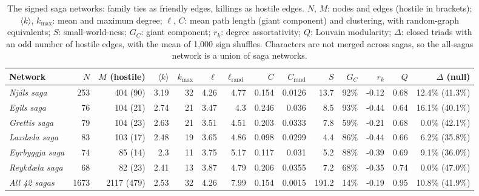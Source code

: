 \begin{table}[t!]
\centering
\caption{The signed saga networks: family ties as friendly edges, killings as hostile edges. $N$, $M$: nodes and edges (hostile in brackets); $\langle k\rangle$, $k_{\max}$: mean and maximum degree; $\ell$, $C$: mean path length (giant component) and clustering, with random-graph equivalents; $S$: small-world-ness; $G_C$: giant component; $r_k$: degree assortativity; $Q$: Louvain modularity; $\Delta$: closed triads with an odd number of hostile edges, with the mean of 1{,}000 sign shuffles. Characters are not merged across sagas, so the all-sagas network is a union of saga networks.}
\label{tab:network}
\begin{tabular*}{\textwidth}{@{\extracolsep{\fill}}lrrrrrrrrrrrrr@{}}
\toprule
Network & $N$ & $M$ (hostile) & $\langle k\rangle$ & $k_{\max}$ & $\ell$ & $\ell_{\mathrm{rand}}$ & $C$ & $C_{\mathrm{rand}}$ & $S$ & $G_C$ & $r_k$ & $Q$ & $\Delta$ (null) \\
\midrule
\textit{Njáls saga} & 253 & 404 (90) & 3.19 & 32 & 4.26 & 4.77 & 0.154 & 0.0126 & 13.7 & 92\% & -0.12 & 0.68 & 12.4\% (41.3\%) \\
\textit{Egils saga} & 76 & 104 (21) & 2.74 & 21 & 3.47 & 4.3 & 0.246 & 0.036 & 8.5 & 93\% & -0.44 & 0.64 & 16.1\% (40.1\%) \\
\textit{Grettis saga} & 79 & 104 (23) & 2.63 & 21 & 3.51 & 4.51 & 0.203 & 0.0333 & 7.8 & 59\% & -0.21 & 0.68 & 0.0\% (42.1\%) \\
\textit{Laxdæla saga} & 83 & 103 (17) & 2.48 & 19 & 3.65 & 4.86 & 0.098 & 0.0299 & 4.4 & 86\% & -0.44 & 0.66 & 6.2\% (35.8\%) \\
\textit{Eyrbyggja saga} & 74 & 85 (14) & 2.3 & 11 & 3.75 & 5.17 & 0.117 & 0.031 & 5.2 & 88\% & -0.39 & 0.69 & 9.1\% (36.0\%) \\
\textit{Reykdæla saga} & 68 & 82 (23) & 2.41 & 13 & 3.87 & 4.79 & 0.206 & 0.0355 & 7.2 & 68\% & -0.35 & 0.74 & 0.0\% (47.0\%) \\
\textit{All 42 sagas} & 1673 & 2117 (479) & 2.53 & 32 & 4.26 & 7.99 & 0.154 & 0.0015 & 191.2 & 14\% & -0.19 & 0.95 & 10.8\% (41.9\%) \\
\bottomrule
\end{tabular*}
\end{table}
